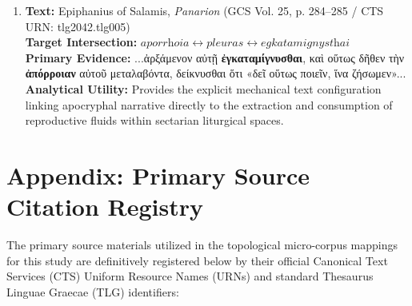 \documentclass[11pt,twoside,a4paper]{article}
\begin{document}
\begin{enumerate}
    \item \textbf{Text:} Epiphanius of Salamis, \textit{Panarion} (GCS Vol. 25, p. 284--285 / CTS URN: tlg2042.tlg005) \\
    \textbf{Target Intersection:} $\textit{aporrhoia} \leftrightarrow \textit{pleuras} \leftrightarrow \textit{egkatamignysthai}$ \\
    \textbf{Primary Evidence:} ...ἀρξάμενον αὐτῇ \textbf{ἐγκαταμίγνυσθαι}, καὶ οὕτως δῆθεν τὴν \textbf{ἀπόρροιαν} αὐτοῦ μεταλαβόντα, δείκνυσθαι ὅτι «δεῖ οὕτως ποιεῖν, ἵνα ζήσωμεν»... \\
    \textbf{Analytical Utility:} Provides the explicit mechanical text configuration linking apocryphal narrative directly to the extraction and consumption of reproductive fluids within sectarian liturgical spaces.
\end{enumerate}


\section{Appendix: Primary Source Citation Registry}
\label{sec:source_registry}

The primary source materials utilized in the topological micro-corpus mappings for this study are definitively registered below by their official Canonical Text Services (CTS) Uniform Resource Names (URNs) and standard Thesaurus Linguae Graecae (TLG) identifiers:
\end{document}
